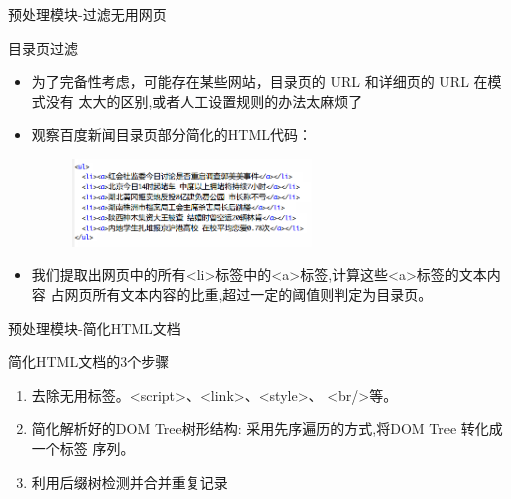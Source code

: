 \begin{frame}[label=sec-2-3]{预处理模块-过滤无用网页}  
  \begin{block}{目录页过滤}
    \begin{itemize}
    \item 为了完备性考虑，可能存在某些网站，目录页的 URL 和详细页的 URL 在模式没有
      太大的区别,或者人工设置规则的办法太麻烦了
     \item<2-> 观察百度新闻目录页部分简化的HTML代码：
       \begin{figure}[h]
        \centering
        \includegraphics[width=0.6\textwidth]{baidunews}
      \end{figure}    
    \item<3-> 我们提取出网页中的所有<li>标签中的<a>标签,计算这些<a>标签的文本内容
      占网页所有文本内容的比重,超过一定的阈值则判定为目录页。
    \end{itemize}
\end{block}
\end{frame}
\begin{frame}[t,label=sec-2-4]{预处理模块-简化HTML文档}
  \begin{block}{简化HTML文档的3个步骤}
\begin{enumerate}
\item 去除无用标签。<script>、<link>、<style>、 <br/>等。
\item<2-> 简化解析好的DOM Tree树形结构: 采用先序遍历的方式,将DOM Tree 转化成一个标签
  序列。
  \vspace{-1cm}
\item<4-> \alert<5>{利用后缀树检测并合并重复记录}
\end{enumerate}
\end{block}
\end{frame}

